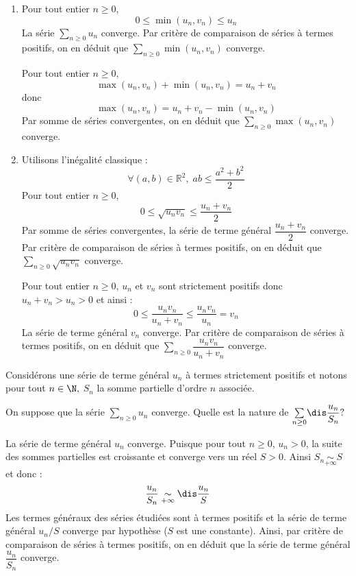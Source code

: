 \documentclass[a4paper,10pt]{report}
\newcommand{\Sum}[2]{\ensuremath{\textstyle{\sum\limits_{#1}^{#2}}}}
\begin{document}
\newpage

\corr  

\begin{enumerate}
\item Pour tout entier $n \geq 0$,
$$ 0 \leq  \min(u_n,v_n) \leq u_n $$
La série $\Sum{n \geq 0}{} u_n$ converge. Par critère de comparaison de séries à termes positifs, on en déduit que $\Sum{n \geq 0}{} \min(u_n,v_n)$ converge. 

\medskip

\noindent Pour tout entier $n \geq 0$,
$$  \max(u_n,v_n) + \min(u_n,v_n) = u_n + v_n $$
donc 
$$ \max(u_n,v_n) =   u_n + v_n - \min(u_n,v_n)$$
Par somme de séries convergentes, on en déduit que $\Sum{n \geq 0}{} \max(u_n,v_n)$ converge.
\item Utilisons l'inégalité classique :
$$ \forall (a,b) \in \mathbb{R}^2, \; ab \leq \dfrac{a^2+b^2}{2}$$
Pour tout entier $n \geq 0$,
$$ 0 \leq \sqrt{u_n v_n} \leq \dfrac{u_n+ v_n}{2}$$
Par somme de séries convergentes, la série de terme général $\dfrac{u_n+ v_n}{2}$ converge. Par critère de comparaison de séries à termes positifs, on en déduit que $\Sum{n \geq 0}{} \sqrt{u_n v_n}$ converge. 

\medskip

\noindent Pour tout entier $n \geq 0$, $u_n$ et $v_n$ sont strictement positifs donc $u_n+v_n > u_n >0$ et ainsi :
$$ 0 \leq \dfrac{u_n v_n}{u_n+v_n} \leq \dfrac{u_n v_n}{u_n} = v_n$$
La série de terme général $v_n$ converge. Par critère de comparaison de séries à termes positifs, on en déduit que $\Sum{n \geq 0}{} \dfrac{u_n v_n}{u_n+v_n}$ converge. 
\end{enumerate}

\medskip

\begin{Exa} Considérons une série de terme général $u_n$ à termes strictement positifs et notons pour tout $n\in\N,$ $S_n$ la somme partielle d'ordre $n$ associée. 

On suppose que la s\'erie $\Sum{n \geq 0}{} u_n$ converge. Quelle est la nature de $\Sum{n \geq 0}{} \dis \dfrac{u_n}{S_n}?$
\end{Exa}

\corr La s\'erie de terme général $u_n$ converge. Puisque pour tout $n \geq 0$, $u_n>0$, la suite des sommes partielles est croissante et converge vers un réel $S>0.$ Ainsi $S_n \underset{+ \infty}{\sim} S$ et donc :
$$\frac{u_n}{S_n}\underset{+ \infty}{\sim} \dis\frac{u_n}{S}$$
Les termes généraux des séries étudiées sont à termes positifs et la s\'erie de terme général $u_n/S$ converge par hypothèse ($S$ est une constante). Ainsi, par critère de comparaison de séries à termes positifs, on en déduit que la s\'erie de terme général $\dfrac{u_n}{S_n}$ converge.
\end{document}
